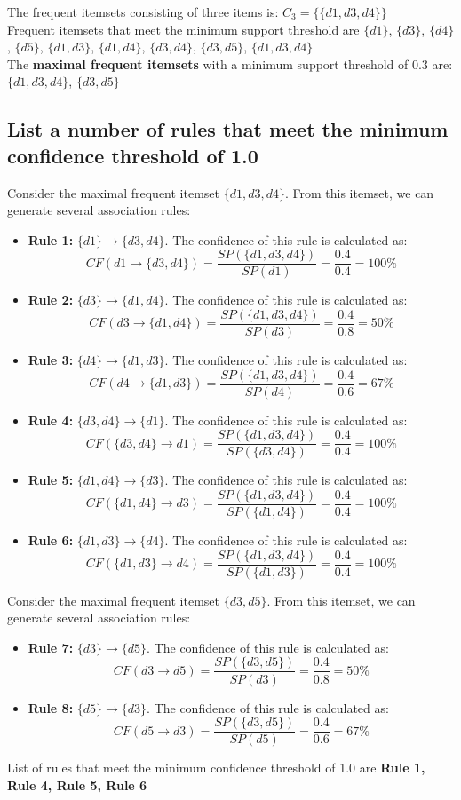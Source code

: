The frequent itemsets consisting of three items is: \(C_3=\{\{d1,d3,d4\}\}\)\\
Frequent itemsets that meet the minimum support threshold are \(\{d1\}\), \(\{d3\}\), \(\{d4\}\), \(\{d5\}\), \(\{d1,d3\}\), \(\{d1,d4\}\), \(\{d3,d4\}\), \(\{d3,d5\}\), \(\{d1,d3,d4\}\)\\
The \textbf{maximal frequent itemsets} with a minimum support threshold of 0.3 are:\\ \(\{d1,d3,d4\}\), \(\{d3,d5\}\)
\subsection{List a number of rules that meet the minimum confidence threshold of 1.0}
Consider the maximal frequent itemset \(\{d1,d3,d4\}\). From this itemset, we can generate several association rules:
\begin{itemize}
\item \textbf{Rule 1:} \(\{d1\} \rightarrow \{d3,d4\}\). The confidence of this rule is calculated as: \[CF(d1 \rightarrow \{d3,d4\}) = \frac{SP(\{d1, d3, d4\})}{SP(d1)} = \frac{0.4}{0.4} = 100\%\]
\item \textbf{Rule 2:} \(\{d3\} \rightarrow \{d1,d4\}\). The confidence of this rule is calculated as: \[CF(d3 \rightarrow \{d1,d4\}) = \frac{SP(\{d1, d3, d4\})}{SP(d3)} = \frac{0.4}{0.8} = 50\%\]
\item \textbf{Rule 3:} \(\{d4\} \rightarrow \{d1,d3\}\). The confidence of this rule is calculated as: \[CF(d4 \rightarrow \{d1,d3\}) = \frac{SP(\{d1, d3, d4\})}{SP(d4)} = \frac{0.4}{0.6} = 67\%\]
\item \textbf{Rule 4:} \(\{d3,d4\} \rightarrow \{d1\}\). The confidence of this rule is calculated as: \[CF(\{d3,d4\} \rightarrow d1) = \frac{SP(\{d1, d3, d4\})}{SP(\{d3,d4\})} = \frac{0.4}{0.4} = 100\%\]
\item \textbf{Rule 5:} \(\{d1,d4\} \rightarrow \{d3\}\). The confidence of this rule is calculated as: \[CF(\{d1,d4\} \rightarrow d3) = \frac{SP(\{d1, d3, d4\})}{SP(\{d1,d4\})} = \frac{0.4}{0.4} = 100\%\]
\item \textbf{Rule 6:} \(\{d1,d3\} \rightarrow \{d4\}\). The confidence of this rule is calculated as: \[CF(\{d1,d3\} \rightarrow d4) = \frac{SP(\{d1, d3, d4\})}{SP(\{d1,d3\})} = \frac{0.4}{0.4} = 100\%\]
\end{itemize}
Consider the maximal frequent itemset \(\{d3,d5\}\). From this itemset, we can generate several association rules:

\begin{itemize}
\item \textbf{Rule 7:} \(\{d3\} \rightarrow \{d5\}\). The confidence of this rule is calculated as: \[CF(d3 \rightarrow d5) = \frac{SP(\{d3, d5\})}{SP(d3)} = \frac{0.4}{0.8} = 50\%\]
\item \textbf{Rule 8:} \(\{d5\} \rightarrow \{d3\}\). The confidence of this rule is calculated as: \[CF(d5 \rightarrow d3) = \frac{SP(\{d3, d5\})}{SP(d5)} = \frac{0.4}{0.6} = 67\%\]
\end{itemize}
List of rules that meet the minimum confidence threshold of 1.0 are \textbf{Rule 1, Rule 4, Rule 5, Rule 6}


